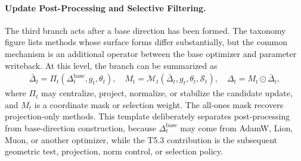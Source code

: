 \paragraph{Update Post-Processing and Selective Filtering.}
\label{sec:t5-post-processing}

The third branch acts after a base direction has been formed.  The taxonomy
figure lists methods whose surface forms differ substantially, but the common
mechanism is an additional operator between the base optimizer and parameter
writeback.  At this level, the branch can be summarized as
\begin{equation}
\begin{aligned}
  \bar{\Delta}_t=\Pi_t(\Delta_t^{\mathrm{base}},g_t,\theta_t),\quad
  M_t=\mathcal{M}_t(\bar{\Delta}_t,g_t,\theta_t,\mathcal{S}_t),\quad
  \Delta_t=M_t\odot\bar{\Delta}_t ,
\end{aligned}
\label{eq:t5-filter-template}
\end{equation}
where $\Pi_t$ may centralize, project, normalize, or stabilize the candidate
update, and $M_t$ is a coordinate mask or selection weight.  The all-ones mask
recovers projection-only methods.  This template deliberately separates
post-processing from base-direction construction, because $\Delta_t^{\mathrm{base}}$
may come from AdamW, Lion, Muon, or another optimizer, while the T5.3
contribution is the subsequent geometric test, projection, norm control, or
selection policy.
